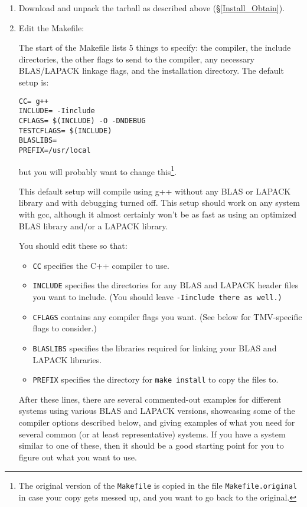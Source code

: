\begin{enumerate}
\item Download and unpack the tarball as described above (\S\ref{Install_Obtain}).

\item
Edit the Makefile:

The start of the Makefile lists 5 things to specify: the compiler,
the include directories, the other flags to send to the compiler, 
any necessary BLAS/LAPACK linkage flags, and the installation directory.
The default setup is:
\begin{verbatim}
CC= g++
INCLUDE= -Iinclude
CFLAGS= $(INCLUDE) -O -DNDEBUG
TESTCFLAGS= $(INCLUDE)
BLASLIBS=
PREFIX=/usr/local
\end{verbatim}
but you will probably want to change this\footnote{
The original version of the \texttt{Makefile}
is copied in the file \texttt{Makefile.original} in case your copy gets messed up, and you want to 
go back to the original.}.

This default setup will compile using g++ without any BLAS or LAPACK library and 
with debugging turned off. 
This setup should work on any system with gcc, although it almost certainly 
won't be as fast as using an optimized BLAS library and/or a LAPACK library.

You should edit these so that:
\begin{itemize}
\item \texttt{CC} specifies the C++ compiler to use.
\item \texttt{INCLUDE} specifies the directories for any BLAS and LAPACK header
files you want to include. (You should leave \tt{-Iinclude} there as well.)
\item \texttt{CFLAGS} contains any compiler flags you want.
(See below for TMV-specific flags to consider.)
\item \texttt{BLASLIBS} specifies the libraries required for linking your BLAS and LAPACK libraries.
\item \texttt{PREFIX} specifies the directory for \texttt{make install} to copy the files to.
\end{itemize}

After these lines, there are several commented-out examples for different systems 
using various BLAS
and LAPACK versions, showcasing some of the compiler options described below,
and giving examples of what you need for several common (or at least representative) systems.
If you have a system similar to one of these, then it should be a good 
starting point for you to figure out what you want to use.


\end{enumerate}
